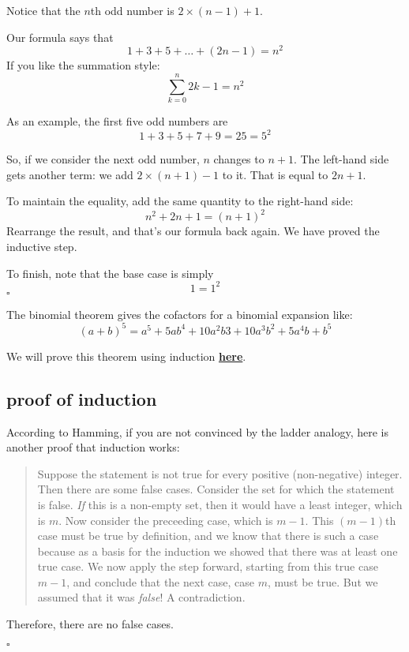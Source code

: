 \documentclass[11pt, oneside]{article}
\begin{document}
Notice that the $n$th odd number is $2 \times (n-1) + 1$.

Our formula says that
\[ 1 + 3 + 5 + \dots + (2n - 1) = n^2 \]
If you like the summation style:
\[ \sum_{k=0}^n 2k - 1 = n^2 \]

As an example, the first five odd numbers are
\[ 1 + 3 + 5 + 7 + 9 = 25 = 5^2 \]

So, if we consider the next odd number, $n$ changes to $n+1$.  The left-hand side gets another term:  we add $2 \times (n+1)-1$ to it.  That is equal to $2n + 1$.

To maintain the equality, add the same quantity to the right-hand side:
\[ n^2 + 2n + 1 = (n+1)^2 \]
Rearrange the result, and that's our formula back again.  We have proved the inductive step.  

To finish, note that the base case is simply
\[ 1 = 1^2 \]
$\square$

The binomial theorem gives the cofactors for a binomial expansion like:
\[ (a + b)^5 = a^5 + 5ab^4 + 10a^2b3 + 10a^3b^2 + 5a^4b + b^5 \]

We will prove this theorem using induction \hyperref[sec:binomial]{\textbf{here}}.

\subsection*{proof of induction}

According to Hamming, if you are not convinced by the ladder analogy, here is another proof that induction works:

\begin{quote}Suppose the statement is not true for every positive (non-negative) integer.  Then there are some false cases.  Consider the set for which the statement is false.  \emph{If} this is a non-empty set, then it would have a least integer, which is $m$.  Now consider the preceeding case, which is $m - 1$.  This $(m-1)$th case must be true by definition, and we know that there is such a case because as a basis for the induction we showed that there was at least one true case.  We now apply the step forward, starting from this true case $m-1$, and conclude that the next case, case $m$, must be true.  But we assumed that it was \emph{false}!  A contradiction. \end{quote}

Therefore, there are no false cases.

$\square$
\end{document}
